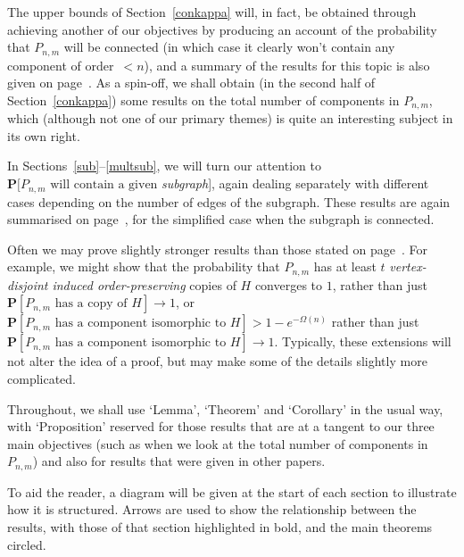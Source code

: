 \documentclass{article}
\newtheorem{Proof of Theorem}{Proof of Theorem}
\begin{document}
The upper bounds of Section~\ref{conkappa} will, in fact,
be obtained through achieving another of our objectives
by producing an account of the probability that $P_{n,m}$ will be connected
(in which case it clearly won't contain any component of order~$<n$),
and a summary of the results for this topic
is also given on page~\pageref{main cpt}.
As a spin-off,
we shall obtain (in the second half of Section~\ref{conkappa}) 
some results on the total number of components in $P_{n,m}$,
which (although not one of our primary themes)
is quite an interesting subject in its own right.

In Sections~\ref{sub}--\ref{multsub},
we will turn our attention to 
$\mathbf{P}[P_{n,m} \textrm{ will contain a given}$ \textit{subgraph}],
again dealing separately with different cases
depending on the number of edges of the subgraph.
These results are again summarised on page~\pageref{main cpt},
for the simplified case when the subgraph is connected. 

Often we may prove slightly stronger results than those stated on page~\pageref{main cpt}.
For example, we might show that the probability that
$P_{n,m}$ has at least $t$ \textit{vertex-disjoint induced order-preserving} copies of $H$
converges to $1$,
rather than just
$\mathbf{P}\left[P_{n,m} \textrm{ has a copy of } H \right] \to 1$,
or
$\mathbf{P}\left[P_{n,m} \textrm{ has a component isomorphic to } H \right] > 1-e^{- \Omega (n)}$
rather than just
$\mathbf{P}\left[P_{n,m} \textrm{ has a component isomorphic to } H \right] \to 1$.
Typically, these extensions will not alter the idea of a proof,
but may make some of the details slightly more complicated. 

Throughout,
we shall use `Lemma', `Theorem' and `Corollary' in the usual way,
with `Proposition' reserved for those results that are at a tangent to
our three main objectives
(such as when we look at the total number of components in $P_{n,m}$)
and also for results that were given in other papers.

To aid the reader,
a diagram will be given at the start of each section to illustrate how it is structured.
Arrows are used to show the relationship between the results,
with those of that section highlighted in bold,
and the main theorems circled.
\end{document}
